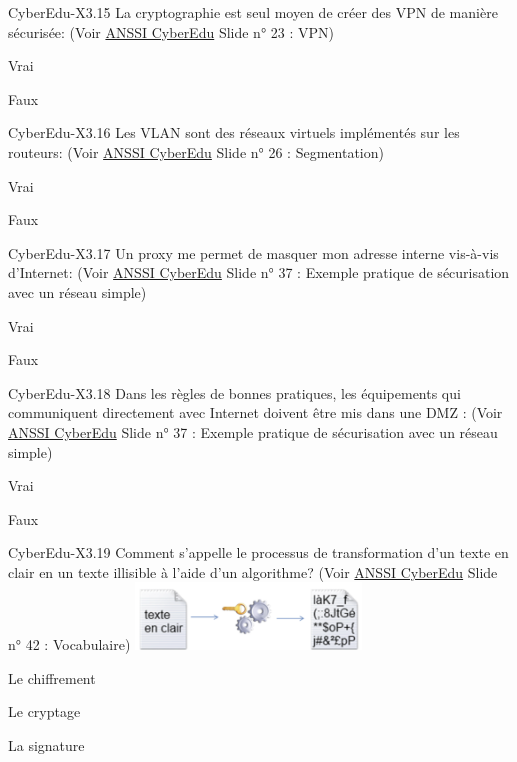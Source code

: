 \begin{multi}[multiple=true]{CyberEdu-X3.15}
	La cryptographie est seul moyen de créer des VPN de manière sécurisée: (Voir \href{https://www.ssi.gouv.fr/administration/formations/cyberedu/contenu-pedagogique-cyberedu/}{ANSSI CyberEdu} Slide n° 23 : VPN)
\item Vrai
\item* Faux
\end{multi}
\begin{multi}[multiple=true]{CyberEdu-X3.16}
	Les VLAN sont des réseaux virtuels implémentés sur les routeurs: (Voir \href{https://www.ssi.gouv.fr/administration/formations/cyberedu/contenu-pedagogique-cyberedu/}{ANSSI CyberEdu} Slide n° 26 : Segmentation)
\item Vrai
\item* Faux
\end{multi}
\begin{multi}[multiple=true]{CyberEdu-X3.17}
	Un proxy me permet de masquer mon adresse interne vis-à-vis d'Internet: (Voir \href{https://www.ssi.gouv.fr/administration/formations/cyberedu/contenu-pedagogique-cyberedu/}{ANSSI CyberEdu} Slide n° 37 : Exemple pratique de sécurisation avec un réseau simple)
\item* Vrai
\item Faux
\end{multi}
\begin{multi}[multiple=true]{CyberEdu-X3.18}
	Dans les règles de bonnes pratiques, les équipements qui communiquent directement avec Internet doivent être mis dans une DMZ : (Voir \href{https://www.ssi.gouv.fr/administration/formations/cyberedu/contenu-pedagogique-cyberedu/}{ANSSI CyberEdu} Slide n° 37 : Exemple pratique de sécurisation avec un réseau simple)
\item* Vrai
\item Faux
\end{multi}
\begin{multi}[multiple=true]{CyberEdu-X3.19}
	Comment s'appelle le processus de transformation d'un texte  en clair   en un  texte illisible  à l'aide d'un algorithme? (Voir \href{https://www.ssi.gouv.fr/administration/formations/cyberedu/contenu-pedagogique-cyberedu/}{ANSSI CyberEdu} Slide n° 42 : Vocabulaire)
	\includegraphics[width=6cm]{../Latex/Sources/EXTERNAL/ANSSI/QuizzCyberEdu/img/img3-19.png}
\item* Le chiffrement
\item Le cryptage
\item La signature
 \end{multi}
